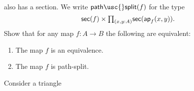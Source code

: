 \begin{exercises}
also has a section. We write $\mathsf{path\usc{}split}(f)$ for the type
\begin{equation*}
\mathsf{sec}(f)\times\prd{x,y:A}\mathsf{sec}(\apfunc{f}(x,y)).
\end{equation*}
Show that for any map $f:A\to B$ the following are equivalent:
\begin{enumerate}
\item The map $f$ is an equivalence.
\item The map $f$ is path-split.
\end{enumerate}
\begin{comment}
\item \label{ex:eqv_sigma_mv}Consider a map
\begin{equation*}
f:A \to \sm{y:B}C(y).
\end{equation*}
\begin{subexenum}
\item Construct a family of maps
\begin{equation*}
f':\prd{y:B} \fib{\proj 1\circ f}{y}\to C(y).
\end{equation*}
\item Construct an equivalence
\begin{equation*}
\eqv{\fib{f'(b)}{c}}{\fib{f}{(b,c)}}
\end{equation*}
for every $(b,c):\sm{y:B}C(y)$.
\item Conclude that the following are equivalent:
\begin{enumerate}
\item $f$ is an equivalence.
\item $f'$ is a family of equivalences.
\end{enumerate}
\end{subexenum}
\item \label{ex:coh_intro}Consider a type $A$ with base point $a:A$, and let $B$ be a type family on $A$ that implies the identity type, i.e., there is a term
\begin{equation*}
\alpha : \prd{x:A} B(x)\to (a=x).
\end{equation*}
Show that the \define{coherence reduction map}
\begin{equation*}
\mathsf{coh\usc{}red} : \Big(\sm{y:B(a)}\alpha(a,y)=\refl{a}\Big) \to \Big(\sm{x:A}B(x)\Big)
\end{equation*}
defined by $\lam{(y,q)}(a,y)$ is an equivalence.
\end{comment}
\item \label{ex:fiber_trans}Consider a triangle

\end{exercises}
